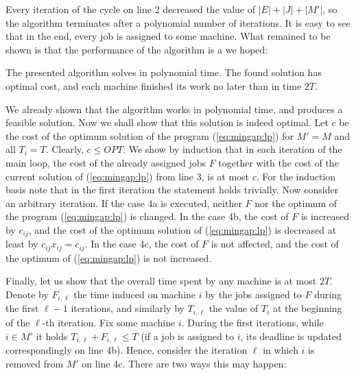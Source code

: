 \noindent
Every iteration of the cycle on line 2 decreased the value of $|E|+|J|+|M'|$, so the algorithm terminates after
a polynomial number of iterations. It is easy to see that in the end, every job is assigned to some machine. 
What remained to be shown is that the performance of the algorithm is a we hoped:


\begin{veta}
  The presented algorithm solves \mingap in polynomial time. The found solution has optimal cost, 
  and each machine finished its work no later than in time $2T$.
\end{veta}

\begin{dokaz}
  We already shown that the algorithm works in polynomial time, and produces a feasible solution.
  Now we shall show that this solution is indeed optimal. Let $c$ be the cost of the optimum
  solution of the program (\ref{eq:mingap:lp}) for $M'=M$ and  all $T_i=T$. Clearly, $c\le OPT$.   
  We show by induction that in each iteration of the main loop, the cost of the already assigned jobs $F$ together
  with the cost of the current solution of  (\ref{eq:mingap:lp}) from line 3, is at most $c$.
  For the induction basis note that in the first iteration the statement holds trivially. Now consider
  an arbitrary iteration. If the case 4a is executed, neither $F$ nor the optimum of the program  (\ref{eq:mingap:lp})
  is changed. In the case 4b, the cost of $F$ is increased by $c_{ij}$, and the cost of the optimum
  solution of (\ref{eq:mingap:lp}) is decreased at least by $c_{ij}x_{ij}=c_{ij}$. In the case 4c, the
  cost of $F$ is not affected, and the cost of the optimum of (\ref{eq:mingap:lp}) is not increased.

  \noindent
  Finally, let us show that the overall time spent by any machine is at most $2T$. 
  Denote  by $F_{i,\ell}$ the time induced on machine $i$ by the jobs assigned to $F$ during the
  first $\ell-1$ iterations, and similarly by $T_{i,\ell}$ the value of  $T_i$ at the beginning of the
  $\ell$-th iteration. Fix some machine $i$. During the first iterations, while $i\in M'$
  it holds $T_{i,\ell}+F_{i,\ell}\le T$ (if a job is assigned to $i$, its deadline is updated correspondingly on
  line 4b). Hence, consider the iteration $\ell$ in which $i$ is removed from $M'$ on line 4c. There are two ways 
  this may happen:


\end{dokaz}
